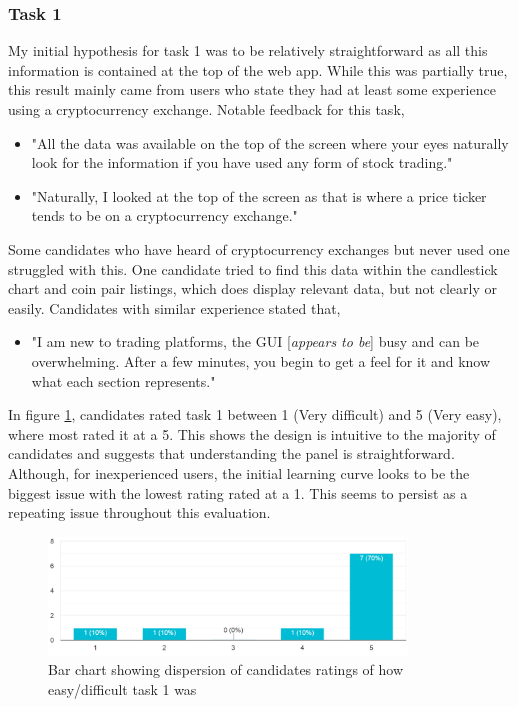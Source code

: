 \subsubsection{Task 1}
\label{sec:evaluation:ui:tasks:q1}
\noindent My initial hypothesis for task 1 was to be relatively straightforward as all this information is contained at the top of the web app. While this was partially true, this result mainly came from users who state they had at least some experience using a cryptocurrency exchange. Notable feedback for this task,
\begin{itemize}
\item "All the data was available on the top of the screen where your eyes naturally look for the information if you have used any form of stock trading."
\item  "Naturally, I looked at the top of the screen as that is where a price ticker tends to be on a cryptocurrency exchange."
\end{itemize}

\noindent Some candidates who have heard of cryptocurrency exchanges but never used one struggled with this. One candidate tried to find this data within the candlestick chart and coin pair listings, which does display relevant data, but not clearly or easily. Candidates with similar experience  stated that,
\begin{itemize}
\item "I am new to trading platforms, the GUI [\textit{appears to be}] busy and can be overwhelming. After a few minutes, you begin to get a feel for it and know what each section represents." 
\end{itemize}


\noindent In figure \ref{fig:eval:web_app:task1_was_it_easy}, candidates rated task 1 between 1 (Very difficult) and 5 (Very easy), where most rated it at a 5. This shows the design is intuitive to the majority of candidates and suggests that understanding the panel is straightforward. Although, for inexperienced users, the initial learning curve looks to be the biggest issue with the lowest rating rated at a 1. This seems to persist as a repeating issue throughout this evaluation.

  \begin{figure}[ht]
  \centering
 \includegraphics[width=0.85\textwidth]{content/graphics/task1_was_it_easy.PNG}
  \caption{Bar chart showing dispersion of candidates ratings of how easy/difficult task 1 was}
  \label{fig:eval:web_app:task1_was_it_easy}
\end{figure}

